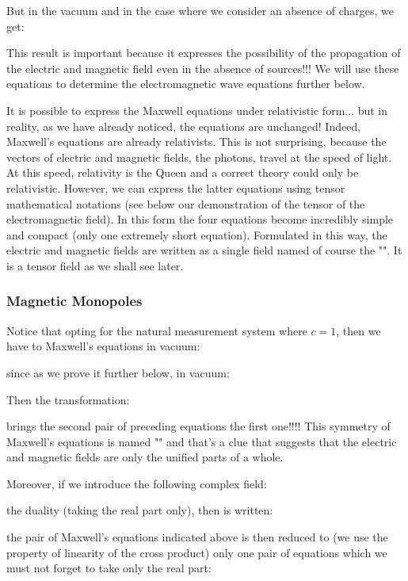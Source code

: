 	But in the vacuum and in the case where we consider an absence of charges, we get:
	
	This result is important because it expresses the possibility of the propagation of the electric and magnetic field even in the absence of sources!!! We will use these equations to determine the electromagnetic wave equations further below.
	\begin{tcolorbox}[title=Remark,colframe=black,arc=10pt]
	It is possible to express the Maxwell equations under relativistic form... but in reality, as we have already noticed, the equations are unchanged! Indeed, Maxwell's equations are already relativists. This is not surprising, because the vectors of electric and magnetic fields, the photons, travel at the speed of light. At this speed, relativity is the Queen and a correct theory could only be relativistic. However, we can express the latter equations using tensor mathematical notations (see below our demonstration of the tensor of the electromagnetic field). In this form the four equations become incredibly simple and compact (only one extremely short equation). Formulated in this way, the electric and magnetic fields are written as a single field named of course the "". It is a tensor field as we shall see later.
	\end{tcolorbox}
	

	\subsubsection{Magnetic Monopoles}
	Notice that opting for the natural measurement system where $c=1$, then we have to Maxwell's equations in vacuum:
	
	since as we prove it further below, in vacuum:
	
	Then the transformation:
	
	brings the second pair of preceding equations the first one!!!! This symmetry of Maxwell's equations is named "" and that's a clue that suggests that the electric and magnetic fields are only the unified parts of a whole.
	
	Moreover, if we introduce the following complex field:
	
	the duality (taking the real part only), then is written:
	
	the pair of Maxwell's equations indicated above is then reduced to (we use the property of linearity of the cross product) only one pair of equations which we must not forget to take only the real part:
	
